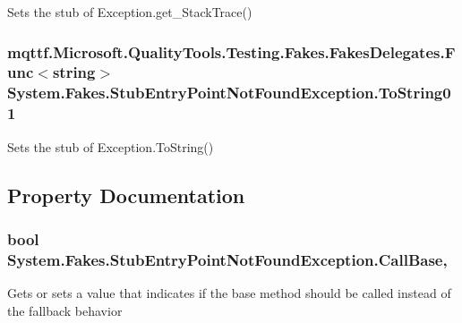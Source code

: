 Sets the stub of Exception.\-get\-\_\-\-Stack\-Trace()

\hypertarget{class_system_1_1_fakes_1_1_stub_entry_point_not_found_exception_a429eb938007a3c4ea55a0239b0044250}{
\subsubsection[{To\-String01}]{\setlength{\rightskip}{0pt plus 5cm}mqttf.\-Microsoft.\-Quality\-Tools.\-Testing.\-Fakes.\-Fakes\-Delegates.\-Func$<$string$>$ System.\-Fakes.\-Stub\-Entry\-Point\-Not\-Found\-Exception.\-To\-String01}}\label{class_system_1_1_fakes_1_1_stub_entry_point_not_found_exception_a429eb938007a3c4ea55a0239b0044250}


Sets the stub of Exception.\-To\-String()



\subsection{Property Documentation}
\hypertarget{class_system_1_1_fakes_1_1_stub_entry_point_not_found_exception_af7ba3366ca82c8d7aa9484af54db6f94}{
\subsubsection[{Call\-Base}]{\setlength{\rightskip}{0pt plus 5cm}bool System.\-Fakes.\-Stub\-Entry\-Point\-Not\-Found\-Exception.\-Call\-Base\hspace{0.3cm}{\ttfamily [get]}, {\ttfamily [set]}}}\label{class_system_1_1_fakes_1_1_stub_entry_point_not_found_exception_af7ba3366ca82c8d7aa9484af54db6f94}


Gets or sets a value that indicates if the base method should be called instead of the fallback behavior

